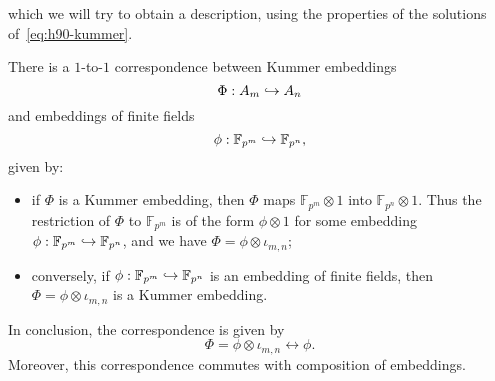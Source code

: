 which we will try to obtain a description, using the properties of the solutions
of~\eqref{eq:h90-kummer}.
\begin{prop}
  \label{prop:correspondence-embeddings}
  There is a $1$-to-$1$ correspondence between Kummer embeddings
  \[
    \Phi:A_m\hookrightarrow A_n
  \]
  and embeddings of finite fields
  \[
    \phi:\mathbb{F}_{p^m}\hookrightarrow\mathbb{F}_{p^n},
  \]
  given by:
  \begin{itemize}
    \item if $\Phi$ is a Kummer embedding, then $\Phi$ maps
      $\mathbb{F}_{p^m}\otimes1$ into $\mathbb{F}_{p^n}\otimes1$. Thus the
      restriction of $\Phi$ to $\mathbb{F}_{p^m}$ is of the form $\phi\otimes1$
      for some embedding $\phi:\mathbb{F}_{p^m}\hookrightarrow\mathbb{F}_{p^n}$, and we
      have $\Phi=\phi\otimes\iota_{m, n}$;
    \item conversely, if $\phi:\mathbb{F}_{p^m}\hookrightarrow\mathbb{F}_{p^n}$ is an
      embedding of finite fields, then $\Phi=\phi\otimes\iota_{m, n}$ is a
      Kummer embedding.
  \end{itemize}
  In conclusion, the correspondence is given by
  \[
    \Phi=\phi\otimes\iota_{m, n}\longleftrightarrow \phi.
  \]
  Moreover, this correspondence commutes with composition of embeddings.
\end{prop}
